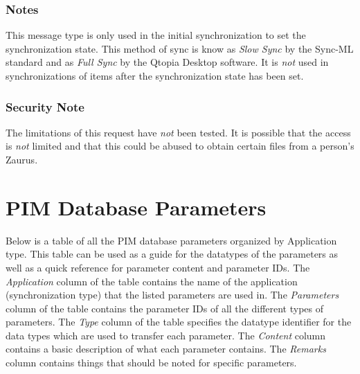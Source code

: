             \subsubsection{Notes}

            This message type is only used in the initial synchronization to
            set the synchronization state. This method of sync is know as
            \emph{Slow Sync} by the Sync-ML standard and as \emph{Full Sync} by
            the Qtopia Desktop software. It is \emph{not} used in
            synchronizations of items after the synchronization state has been
            set.

            \subsubsection{Security Note}
            The limitations of this request have \emph{not} been tested. It is
            possible that the access is \emph{not} limited and that this could
            be abused to obtain certain files from a person's Zaurus.

    \section{PIM Database Parameters}

    Below is a table of all the PIM database parameters organized by
    Application type. This table can be used as a guide for the datatypes of
    the parameters as well as a quick reference for parameter content and
    parameter IDs. The \emph{Application} column of the table contains the
    name of the application (synchronization type) that the listed parameters
    are used in. The \emph{Parameters} column of the table contains the
    parameter IDs of all the different types of parameters. The \emph{Type}
    column of the table specifies the datatype identifier for the data types
    which are used to transfer each parameter. The \emph{Content} column
    contains a basic description of what each parameter contains. The
    \emph{Remarks} column contains things that should be noted for specific
    parameters.

